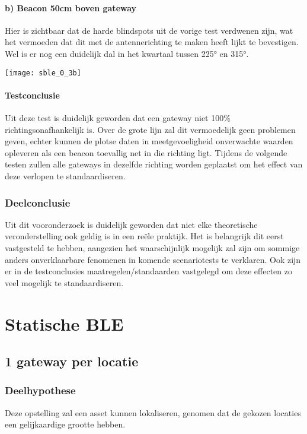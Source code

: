 \paragraph{b) Beacon 50cm boven gateway}

\begin{minipage}{0.55\textwidth}
Hier is zichtbaar dat de harde blindspots uit de vorige test verdwenen zijn, wat het vermoeden dat dit met de antennerichting te maken heeft lijkt te bevestigen. Wel is er nog een duidelijk dal in het kwartaal tussen 225° en 315°.
\end{minipage}
\hfill
\begin{minipage}{0.42\textwidth}
	\texttt{[image: sble\_0\_3b]}
\end{minipage}

\paragraph{Testconclusie}
Uit deze test is duidelijk geworden dat een gateway niet 100\% richtingsonafhankelijk is. Over de grote lijn zal dit vermoedelijk geen problemen geven, echter kunnen de plotse daten in meetgevoeligheid onverwachte waarden opleveren als een beacon toevallig net in die richting ligt.
Tijdens de volgende testen zullen alle gateways in dezelfde richting worden geplaatst om het effect van deze verlopen te standaardiseren. 

\subsubsection{Deelconclusie}
Uit dit vooronderzoek is duidelijk geworden dat niet elke theoretische veronderstelling ook geldig is in een reële praktijk. Het is belangrijk dit eerst vastgesteld te hebben, aangezien het waarschijnlijk mogelijk zal zijn om sommige anders onverklaarbare fenomenen in komende scenariotests te verklaren. Ook zijn er in de testconclusies maatregelen/standaarden vastgelegd om deze effecten zo veel mogelijk te standaardiseren.

\section{Statische BLE}
\subsection{1 gateway per locatie}
\subsubsection{Deelhypothese}
Deze opstelling zal een asset kunnen lokaliseren, genomen dat de gekozen locaties een gelijkaardige grootte hebben.


